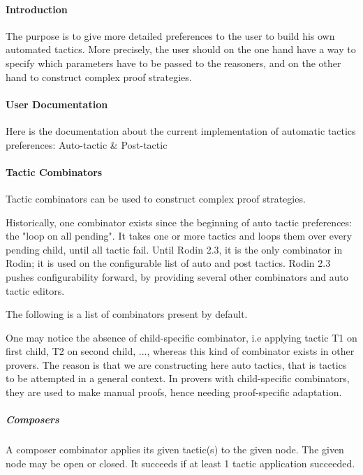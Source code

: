 
\paragraph{Introduction}

The purpose is to give more detailed preferences to the user to build his own automated tactics. More precisely, the user should on the one hand have a way to specify which parameters have to be passed to the reasoners, and on the other hand to construct complex proof strategies.

\paragraph{User Documentation}

Here is the documentation about the current implementation of automatic tactics preferences: Auto-tactic \& Post-tactic

\paragraph{Tactic Combinators}

Tactic combinators can be used to construct complex proof strategies.

Historically, one combinator exists since the beginning of auto tactic preferences: the "loop on all pending". It takes one or more tactics and loops them over every pending child, until all tactic fail. Until Rodin 2.3, it is the only combinator in Rodin; it is used on the configurable list of auto and post tactics. Rodin 2.3 pushes configurability forward, by providing several other combinators and auto tactic editors.

The following is a list of combinators present by default.

One may notice the absence of child-specific combinator, i.e applying tactic T1 on first child, T2 on second child, ..., whereas this kind of combinator exists in other provers. The reason is that we are constructing here auto tactics, that is tactics to be attempted in a general context. In provers with child-specific combinators, they are used to make manual proofs, hence needing proof-specific adaptation.

\subparagraph{Composers}

A composer combinator applies its given tactic(s) to the given node. The given node may be open or closed. It succeeds if at least 1 tactic application succeeded. 

